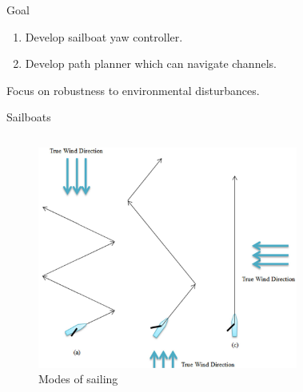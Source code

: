 \documentclass[10pt,xcolor={table,dvipsnames},t]{beamer}
\begin{document}
\begin{frame}{Goal}

\begin{enumerate}
    \item Develop sailboat yaw controller.
    \item Develop path planner which can navigate channels.
\end{enumerate}
Focus on robustness to environmental disturbances.

\end{frame}
  

\begin{frame}{Sailboats}
\begin{columns}

\begin{figure}
    \centering
    \includegraphics[width=\linewidth]{documents/figures/alves_modes.png}
    \caption{Modes of sailing \cite{Alves2010}}
    \label{fig:alves_modes}
\end{figure}
\begin{figure}
    \centering

\end{figure}
\end{columns}
\end{frame}
\end{document}
